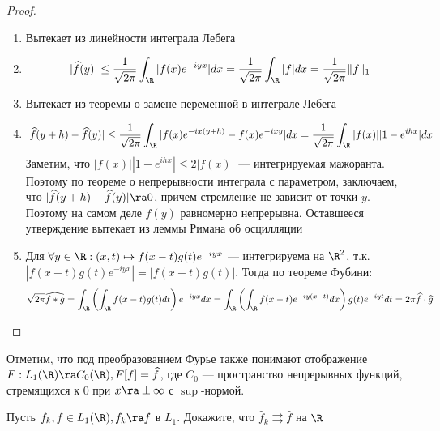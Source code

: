\begin{proof}
    \begin{enumerate}
        \item Вытекает из линейности интеграла Лебега
        \item \[|\widehat{f}(y)| \le \frac{1}{\sqrt{2\pi}}\int_\R |f(x)e^{-iyx}|dx = \frac{1}{\sqrt{2\pi}}\int_\R |f|dx = \frac{1}{\sqrt{2\pi}}\|f\|_1\]
        \item Вытекает из теоремы о замене переменной в интеграле Лебега
        \item \[|\widehat{f}(y + h) - \widehat{f}(y)| \le \frac{1}{\sqrt{2\pi}}\int_\R |f(x)e^{-ix(y + h)} - f(x)e^{-ixy}|dx = \frac{1}{\sqrt{2\pi}}\int_\R |f(x)||1 - e^{ihx}|dx\]
        Заметим, что \(|f(x)||1 - e^{ihx}| \le 2|f(x)|\) --- интегрируемая мажоранта. Поэтому по теореме о непрерывности интеграла с параметром, заключаем, что \(|\widehat{f}(y + h) - \widehat{f}(y)| \ra 0\), причем стремление не зависит от точки \(y\). Поэтому на самом деле \(\widehat{f}(y)\) равномерно непрерывна. Оставшееся утверждение вытекает из леммы Римана об осцилляции


        \item Для \(\forall y \in \R: (x, t) \mapsto f(x - t)g(t)e^{-iyx}\) --- интегрируема на \(\R^2\), т.к. \(|f(x - t)g(t)e^{-iyx}| = |f(x - t)g(t)|\). Тогда по теореме Фубини:
        \[\sqrt{2\pi}\widehat{f * g} = \int_\R\left( \int_\R f(x - t)g(t)dt \right)e^{-iyx}dx = \int_\R\left( \int_\R f(x - t)e^{-iy(x - t)}dx \right)g(t)e^{-iyt}dt = 2\pi\widehat{f}\cdot\widehat{g}\]

    \end{enumerate}
\end{proof}

\begin{note}
    Отметим, что под преобразованием Фурье также понимают отображение \(F: L_1(\R) \ra C_0(\R), F[f] = \widehat{f}\), где \(C_0\) --- пространство непрерывных функций, стремящихся к \(0\) при \(x \ra \pm\infty\) с \(\sup\)-нормой.
\end{note}

\begin{problem}
    Пусть \(f_k, f \in L_1(\R), f_k \ra f\) в \(L_1\). Докажите, что \(\widehat{f}_k \rightrightarrows \widehat{f}\) на \(\R\)
\end{problem}

